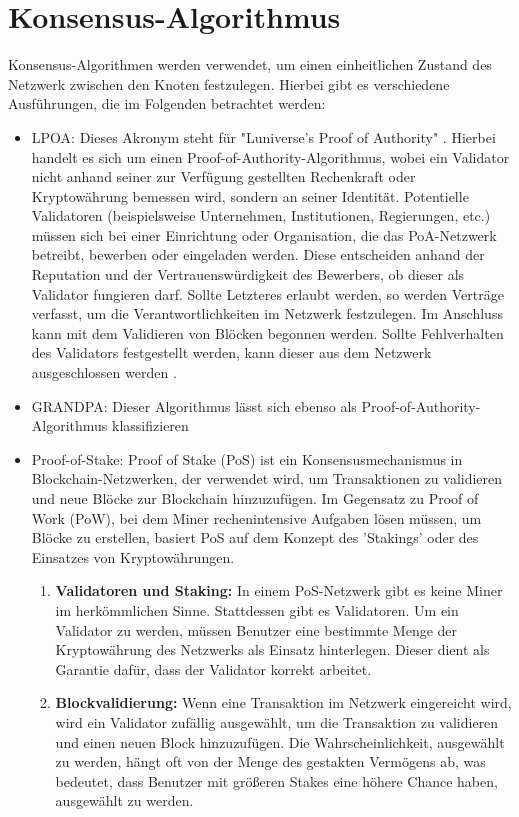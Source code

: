 \section{Konsensus-Algorithmus}
Konsensus-Algorithmen werden verwendet, um einen einheitlichen Zustand des Netzwerk zwischen den Knoten festzulegen. Hierbei gibt es verschiedene Ausführungen, die im Folgenden betrachtet werden:
\begin{itemize}
	\item LPOA: Dieses Akronym steht für "Luniverse's Proof of Authority" \cite{ID50}. Hierbei handelt es sich um einen Proof-of-Authority-Algorithmus, wobei ein Validator nicht anhand seiner zur Verfügung gestellten Rechenkraft oder Kryptowährung bemessen wird, sondern an seiner Identität. Potentielle Validatoren (beispielsweise Unternehmen, Institutionen, Regierungen, etc.) müssen sich bei einer Einrichtung oder Organisation, die das PoA-Netzwerk betreibt, bewerben oder eingeladen werden. Diese entscheiden anhand der Reputation und der Vertrauenswürdigkeit des Bewerbers, ob dieser als Validator fungieren darf. Sollte Letzteres erlaubt werden, so werden Verträge verfasst, um die Verantwortlichkeiten im Netzwerk festzulegen. Im Anschluss kann mit dem Validieren von Blöcken begonnen werden. Sollte Fehlverhalten des Validators festgestellt werden, kann dieser aus dem Netzwerk ausgeschlossen werden \cite{ID51}.
	\item GRANDPA: Dieser Algorithmus lässt sich ebenso als Proof-of-Authority-Algorithmus klassifizieren
	\item Proof-of-Stake: Proof of Stake (PoS) ist ein Konsensusmechanismus in Blockchain-Netzwerken, der verwendet wird, um Transaktionen zu validieren und neue Blöcke zur Blockchain hinzuzufügen. Im Gegensatz zu Proof of Work (PoW), bei dem Miner rechenintensive Aufgaben lösen müssen, um Blöcke zu erstellen, basiert PoS auf dem Konzept des 'Stakings' oder des Einsatzes von Kryptowährungen.
	\begin{enumerate}
		\item \textbf{Validatoren und Staking:} In einem PoS-Netzwerk gibt es keine Miner im herkömmlichen Sinne. Stattdessen gibt es Validatoren. Um ein Validator zu werden, müssen Benutzer eine bestimmte Menge der Kryptowährung des Netzwerks als Einsatz hinterlegen. Dieser dient als Garantie dafür, dass der Validator korrekt arbeitet.
		
		\item \textbf{Blockvalidierung:} Wenn eine Transaktion im Netzwerk eingereicht wird, wird ein Validator zufällig ausgewählt, um die Transaktion zu validieren und einen neuen Block hinzuzufügen. Die Wahrscheinlichkeit, ausgewählt zu werden, hängt oft von der Menge des gestakten Vermögens ab, was bedeutet, dass Benutzer mit größeren Stakes eine höhere Chance haben, ausgewählt zu werden.
		

\end{enumerate}
\end{itemize}
